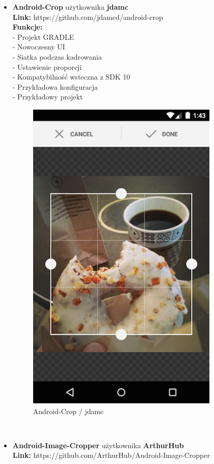\begin{itemize}
\item \textbf{Android-Crop} użytkownika \textbf{jdamc}\\
\textbf{Link:} https://github.com/jdamcd/android-crop\\

\noindent \textbf{Funkcje:}\\
- Projekt GRADLE\\
- Nowoczesny UI\\
- Siatka podczas kadrowania\\
- Ustawienie proporcji\\
- Kompatybilność wsteczna z SDK 10\\
- Przykładowa konfiguracja\\
- Przykładowy projekt\\
\begin{figure}[h!]
\centering
\includegraphics[width=0.25\linewidth]{fig/d1}
\caption{Android-Crop / jdamc}
\label{fig:d1}
\end{figure}\\

\item \textbf{Android-Image-Cropper} użytkownika \textbf{ArthurHub}\\
\textbf{Link:} https://github.com/ArthurHub/Android-Image-Cropper\\


\end{itemize}
